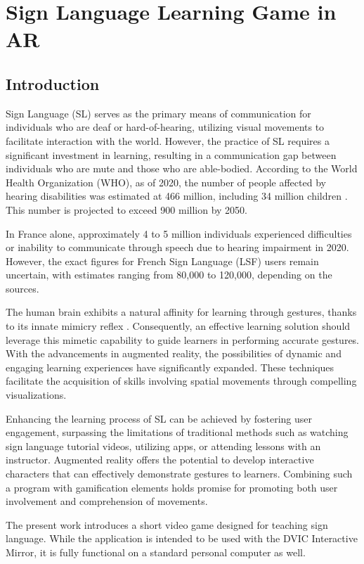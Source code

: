 \chapter{Sign Language Learning Game in AR}

\section{Introduction}

Sign Language (SL) serves as the primary means of communication for individuals who are deaf or hard-of-hearing, utilizing visual movements to facilitate interaction with the world. However, the practice of SL requires a significant investment in learning, resulting in a communication gap between individuals who are mute and those who are able-bodied. According to the World Health Organization (WHO), as of 2020, the number of people affected by hearing disabilities was estimated at 466 million, including 34 million children \cite{el2020sign}. This number is projected to exceed 900 million by 2050.

In France alone, approximately 4 to 5 million individuals experienced difficulties or inability to communicate through speech due to hearing impairment in 2020. However, the exact figures for French Sign Language (LSF) users remain uncertain, with estimates ranging from 80,000 to 120,000, depending on the sources.

The human brain exhibits a natural affinity for learning through gestures, thanks to its innate mimicry reflex \cite{10.3389/fnhum.2012.00153}. Consequently, an effective learning solution should leverage this mimetic capability to guide learners in performing accurate gestures. With the advancements in augmented reality, the possibilities of dynamic and engaging learning experiences have significantly expanded. These techniques facilitate the acquisition of skills involving spatial movements through compelling visualizations.

Enhancing the learning process of SL can be achieved by fostering user engagement, surpassing the limitations of traditional methods such as watching sign language tutorial videos, utilizing apps, or attending lessons with an instructor. Augmented reality offers the potential to develop interactive characters that can effectively demonstrate gestures to learners. Combining such a program with gamification elements holds promise for promoting both user involvement and comprehension of movements.

The present work introduces a short video game designed for teaching sign language. While the application is intended to be used with the DVIC Interactive Mirror, it is fully functional on a standard personal computer as well.


